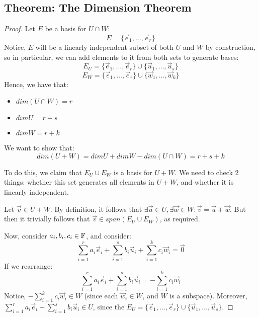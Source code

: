 \documentclass{exam}
\begin{document}
\subsection{Theorem: The Dimension Theorem}


\begin{proof}

Let $E$ be a basis for $U \cap W$:
\[
E = \{\vec{e}_1, \ldots, \vec{e}_r\}
\]
Notice, $E$ will be a linearly independent subset of both $U$ and $W$ by construction, so in particular, we can add elements to it from both sets to generate bases:
\[
E_U = \{\vec{e}_1, \ldots, \vec{e}_r\} \cup \{\vec{u}_1, \ldots, \vec{u}_s\}
\]
\[
E_W = \{\vec{e}_1, \ldots, \vec{e}_r\} \cup \{\vec{w}_1, \ldots, \vec{w}_k\}
\]
Hence, we have that:
\begin{itemize}
    \item $dim(U \cap W) = r$
    \item $dim U = r+s$
    \item $dim W = r + k$
\end{itemize}

We want to show that:
\[
dim(U + W) = dim U + dim W - dim (U \cap W) = r + s + k
\]

To do this, we claim that $E_U \cup E_W$ is a basis for $U + W$. We need to check 2 things: whether this set generates all elements in $U+W$, and whether it is linearly independent.

\bigskip

Let $\vec{v} \in U + W$. By definition, it follows that $\exists \vec{u} \in U, \exists \vec{w} \in W : \vec{v} = \vec{u} + \vec{w}$. But then it trivially follows that $\vec{v} \in span(E_U \cup E_W)$, as required.

\bigskip

Now, consider $a_i, b_i, c_i \in \mathbb{F}$, and consider:
\[
\sum_{i = 1}^r a_i\vec{e}_i + \sum_{i = 1}^s b_i\vec{u}_i + \sum_{i = 1}^k c_i\vec{w}_i = \vec{0}
\]
If we rearrange:
\[
\sum_{i = 1}^r a_i\vec{e}_i + \sum_{i = 1}^s b_i\vec{u}_i = -\sum_{i = 1}^k c_i\vec{w}_i
\]
Notice, $-\sum_{i = 1}^k c_i\vec{w}_i \in W$ (since each $\vec{w}_i \in W$, and $W$ is a subspace). Moreover, $\sum_{i = 1}^r a_i\vec{e}_i + \sum_{i = 1}^s b_i\vec{u}_i \in U$, since the $E_U =  \{\vec{e}_1, \ldots, \vec{e}_r\} \cup \{\vec{u}_1, \ldots, \vec{u}_s\}$.

\bigskip


\end{proof}
\end{document}
